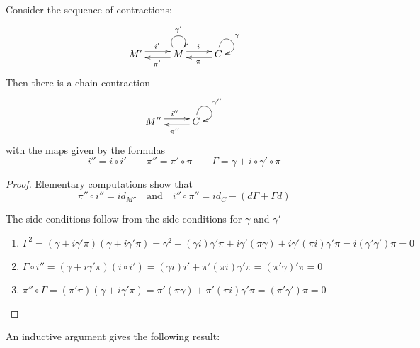 \begin{prop}
Consider the sequence of contractions:
\[
\xymatrixrowsep{0.03in}
\xymatrixcolsep{0.35in}
\xymatrix{
M' \ar[r]<3pt>^{i'} & \ar[l]<3pt>^{\pi '} M \ar@(ul,ur)^{\gamma'}  \ar[r]<3pt>^{i} & \ar[l]<3pt>^{\pi} C \ar@(u,r)^{\gamma}
}
\]
Then there is a chain contraction 
\[
\xymatrixrowsep{0.03in}
\xymatrixcolsep{0.35in}
\xymatrix{
M''  \ar[r]<3pt>^{i''} & \ar[l]<3pt>^{\pi''} C \ar@(u,r)^{\gamma''}
}
\]
with the maps given by the formulas
\[
i'' = i \circ i ' \quad\quad \pi'' = \pi'\circ  \pi \quad\quad \Gamma = \gamma + i \circ \gamma '\circ \pi
\]

\end{prop}
\begin{proof}
Elementary computations show that 
\[
\pi''\circ i'' = id_{M''}\quad\text{and}\quad i'' \circ \pi'' = id_C-(d\Gamma + \Gamma d)
\]

The side conditions follow from the side conditions for $\gamma$ and $\gamma'$
\begin{enumerate}
\item  $\Gamma^2 = (\gamma+i\gamma'\pi)(\gamma+i\gamma'\pi) = \gamma^2 +  (\gamma i)\gamma'\pi + i\gamma'(\pi\gamma)  + i\gamma' (\pi i)\gamma'\pi = i (\gamma'\gamma' )\pi = 0$
\item $ \Gamma \circ i'' = (\gamma + i\gamma'\pi)(i\circ i') = (\gamma i)i'  + \pi' (\pi i)\gamma '\pi =  (\pi'\gamma) '\pi = 0$
\item $\pi''\circ \Gamma = (\pi'\pi)(\gamma+i\gamma'\pi) = \pi' (\pi\gamma) + \pi'( \pi i) \gamma'\pi = (\pi'\gamma' )\pi = 0$
\end{enumerate}

\end{proof}

An inductive argument gives the following result:


